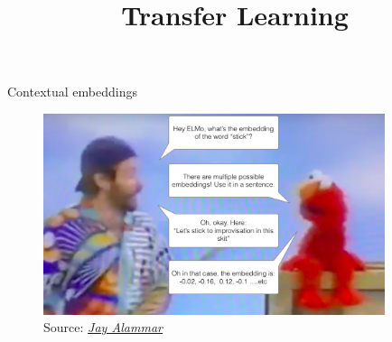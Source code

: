 



\newcommand{\titlefigure}{figure/elmo.jpg}
\newcommand{\learninggoals}{
\item tbd}

\title{Transfer Learning}
\date{}




\begin{vbframe}{Contextual embeddings}

\vfill

	\begin{figure}
		\centering
		\includegraphics[width = 10cm]{figure/elmo-embedding-robin-williams.png}\\ 
		\footnotesize{Source:} \href{https://jalammar.github.io/illustrated-bert/}{\footnotesize \it Jay Alammar}
	\end{figure}

\vfill

\end{vbframe}


